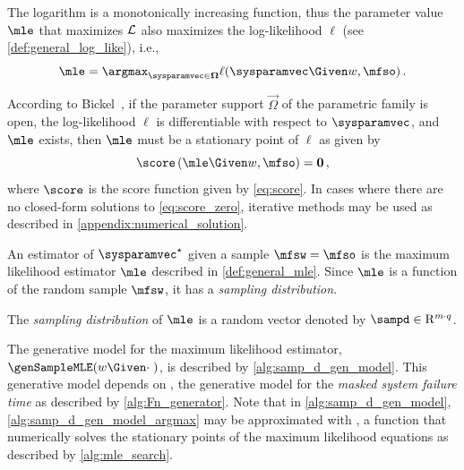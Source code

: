 \documentclass[ ../main.tex]{subfiles}
\begin{document}
The logarithm is a monotonically increasing function, thus the parameter value $\mle$ that maximizes $\mathcal{L}$ also maximizes the log-likelihood $\ell$ (see \cref{def:general_log_like}), i.e.,
\begin{equation}
\label{eq:general_mle}
\mle = \argmax_{\sysparamvec \in \vec\Omega} \ell(\sysparamvec \Given w, \mfso)\,.
\end{equation}

According to Bickel~\cite{bickel}, if the parameter support $\vec\Omega$ of the parametric family is open, the log-likelihood $\ell$ is differentiable with respect to $\sysparamvec$, and $\mle$ exists, then $\mle$ must be a stationary point of $\ell$ as given by
\begin{equation}
\label{eq:score_zero}
\score\left(\mle \Given w, \mfso\right) = \vec{0}\,,
\end{equation}
where $\score$ is the score function given by \cref{eq:score}. In cases where there are no closed-form solutions to \cref{eq:score_zero}, iterative methods may be used as described in \cref{appendix:numerical_solution}.

An estimator of $\tparam\sysparamvec$ given a sample $\mfsw = \mfso$ is the maximum likelihood estimator $\mle$ described in \cref{def:general_mle}. Since $\mle$ is a function of the random sample $\mfsw$, it has a \emph{sampling distribution}.
\begin{definition}
The \emph{sampling distribution} of $\mle$ is a random vector denoted by $\sampd \in \mathrm{R}^{m \cdot q}$.
\end{definition}

\sloppy
The generative model for the maximum likelihood estimator, $\genSampleMLE(w \Given \cdot\;)$, is described by \cref{alg:samp_d_gen_model}. This generative model depends on \genSampleFn, the generative model for the \emph{masked system failure time} as described by \cref{alg:Fn_generator}. Note that in \cref{alg:samp_d_gen_model}, \cref{alg:samp_d_gen_model_argmax} may be approximated with \findmle, a function that numerically solves the stationary points of the maximum likelihood equations as described by \cref{alg:mle_search}.
\end{document}
